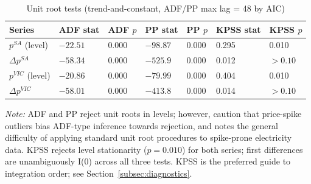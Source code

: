 \documentclass[12pt,a4paper]{article}
\begin{document}
\begin{table}[htbp]
  \centering
  \caption{Unit root tests (trend-and-constant, ADF/PP max lag = 48 by AIC)}
  \label{tab:unitroot}
  \begin{threeparttable}
    \begin{tabular}{lR{1.7cm}R{1.7cm}R{1.7cm}R{1.7cm}R{1.7cm}R{1.7cm}}
      \toprule
      Series & ADF stat & ADF $p$ & PP stat & PP $p$ & KPSS stat & KPSS $p$ \\
      \midrule
      $p^{SA}$ (level) & $-22.51$ & 0.000 & $-98.87$ & 0.000 & 0.295 & 0.010 \\
      $\Delta p^{SA}$ & $-58.34$ & 0.000 & $-525.9$ & 0.000 & 0.012 & $>0.10$ \\
      $p^{VIC}$ (level) & $-20.86$ & 0.000 & $-79.99$ & 0.000 & 0.404 & 0.010 \\
      $\Delta p^{VIC}$ & $-58.01$ & 0.000 & $-413.8$ & 0.000 & 0.014 & $>0.10$ \\
      \bottomrule
    \end{tabular}
    \begin{tablenotes}
      \small
      \item \textit{Note:} ADF and PP reject unit roots in levels; however,
        \textcite{escribano2011modelling} caution that price-spike outliers bias
        ADF-type inference towards rejection, and \textcite{weron2006modeling}
        notes the general difficulty of applying standard unit root procedures to
        spike-prone electricity data.  KPSS rejects level stationarity
        ($p = 0.010$) for both series; first differences are unambiguously I(0)
        across all three tests.  KPSS is the preferred guide to integration order;
        see Section~\ref{subsec:diagnostics}.
    \end{tablenotes}
  \end{threeparttable}
\end{table}
\end{document}
